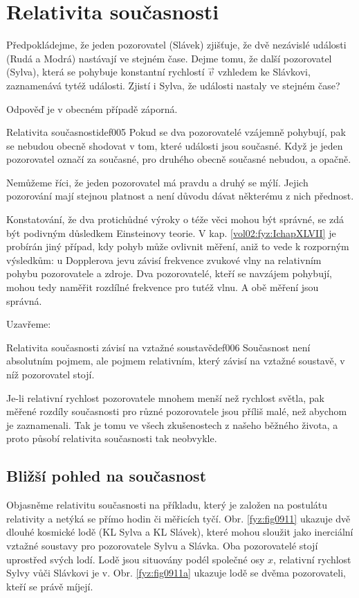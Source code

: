   \section{Relativita současnosti}
    Předpokládejme, že jeden pozorovatel (Slávek) zjišťuje, že dvě nezávislé události (Rudá a Modrá)
    nastávají ve stejném čase. Dejme tomu, že další pozorovatel (Sylva), která se pohybuje
    konstantní rychlostí \(\vec{v}\) vzhledem ke Slávkovi, zaznamenává tytéž události. Zjistí i
    Sylva, že události nastaly ve stejném čase?

    Odpověď je v obecném případě záporná.
    \begin{fyzdef}{Relativita současnosti}{def005}          
      Pokud se dva pozorovatelé vzájemně pohybují, pak se nebudou obecně shodovat v tom, které
      události jsou současné. Když je jeden pozorovatel označí za současné, pro druhého obecně
      současné nebudou, a opačně.
    \end{fyzdef}

    Nemůžeme říci, že jeden pozorovatel má pravdu a druhý se mýlí. Jejich pozorování mají stejnou
    platnost a není důvodu dávat některému z nich přednost.

    Konstatování, že dva protichůdné výroky o téže věci mohou být správné, se zdá být podivným
    důsledkem Einsteinovy teorie. V kap. \ref{vol02:fyz:IchapXLVII} je probírán jiný případ, kdy
    pohyb může ovlivnit měření, aniž to vede k rozporným výsledkům: u Dopplerova jevu závisí
    frekvence zvukové vlny na relativním pohybu pozorovatele a zdroje. Dva pozorovatelé, kteří se
    navzájem pohybují, mohou tedy naměřit rozdílné frekvence pro tutéž vlnu. A obě měření jsou
    správná.

    Uzavřeme:
    \begin{fyzdef}{Relativita současnosti závisí na vztažné soustavě}{def006}          
      Současnost není absolutním pojmem, ale pojmem relativním, který závisí na vztažné soustavě,
      v níž pozorovatel stojí.
    \end{fyzdef}

    Je-li relativní rychlost pozorovatele mnohem menší než rychlost světla, pak měřené rozdíly
    současnosti pro různé pozorovatele jsou příliš malé, než abychom je zaznamenali. Tak je tomu ve
    všech zkušenostech z našeho běžného života, a proto působí relativita současnosti tak neobvykle.

    \subsection{Bližší pohled na současnost}
      Objasněme relativitu současnosti na příkladu, který je založen na postulátu relativity a
      netýká se přímo hodin či měřicích tyčí. Obr. \ref{fyz:fig0911} ukazuje dvě dlouhé kosmické lodě
      (KL Sylva a KL Slávek), které mohou sloužit jako inerciální vztažné soustavy pro pozorovatele
      Sylvu a Slávka. Oba pozorovatelé stojí uprostřed svých lodí. Lodě jsou situovány podél
      společné osy \(x\), relativní rychlost Sylvy vůči Slávkovi je v. Obr. \ref{fyz:fig0911a}
      ukazuje lodě se dvěma pozorovateli, kteří se právě míjejí.

